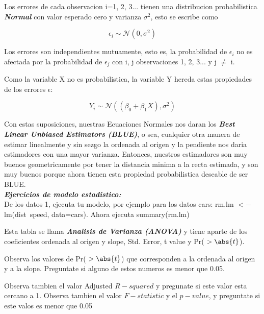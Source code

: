 \documentclass[letterpaper,11pt]{article}\usepackage[]{graphicx}\usepackage[]{color}
\begin{document}
\begin{itemization}
\item Los errores de cada observacion i=1, 2, 3... tienen una distribucion probabilistica \textbf{\textit{Normal}} con valor esperado cero y varianza $\sigma^{2}$, esto se escribe como

	\begin{equation}
\epsilon_{i} \sim \mathcal{N}(0,\sigma^{2})
	\end{equation}

\item Los errores son independientes mutuamente, esto es, la probabilidad de $\epsilon_{i}$ no es afectada por la probabilidad de 
$\epsilon_{j}$ con i, j observaciones 1, 2, 3... y j $\neq$ i.

Como la variable X no es probabilistica, la variable Y hereda estas propiedades de los errores $\epsilon$:

	\begin{equation}
Y_{i} \sim \mathcal{N}( (\beta_{0} + \beta_{1} X),\sigma^{2})
	\end{equation}
	
Con estas suposiciones, nuestras Ecuaciones Normales nos daran los \textbf{\textit{Best Linear Unbiased Estimators (BLUE)}},
o sea, cualquier otra manera de estimar linealmente y sin sezgo la ordenada al origen y la pendiente nos daria estimadores con una mayor varianza. Entonces, nuestros estimadores son muy buenos geometricamente por tener la distancia minima a la recta estimada, y son muy buenos porque ahora tienen esta propiedad probabilistica deseable de ser BLUE.\\

\textbf{\textit{Ejercicios de modelo estadistico:}}\\

De los datos 1, ejecuta tu modelo, por ejemplo para los datos cars: rm.lm $<-$ lm(dist~speed, data=cars).
Ahora ejecuta summary(rm.lm)

Esta tabla se llama \textbf{\textit{Analisis de Varianza (ANOVA)}} y tiene aparte de los coeficientes ordenada al origen y slope,
Std. Error, t value y Pr( $> \abs{t}$).

Observa los valores de Pr( $> \abs{t}$) que corresponden a la ordenada al origen y a la slope.
Preguntate si alguno de estos numeros es menor que 0.05.

Observa tambien el valor Adjusted $R-squared$ y pregunate si este valor esta cercano a 1.
Observa tambien el valor $F-statistic$ y el $p-value$, y preguntate si este valos es menor que 0.05


\end{itemization}
\end{document}
